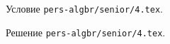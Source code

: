 \problem
Условие \texttt{pers-algbr/senior/4.tex}.

\solution Решение \texttt{pers-algbr/senior/4.tex}.
\endproblem

